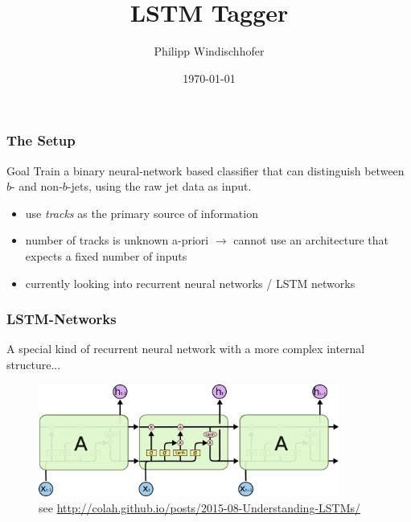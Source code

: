 \documentclass{beamer}
\title{LSTM Tagger}
\author{Philipp Windischhofer}
\date{\today}
\begin{document}
 
\frame{\titlepage}


\begin{frame}
  \frametitle{The Setup}

  \begin{block}{Goal}
    Train a binary neural-network based classifier that can distinguish between $b$- and non-$b$-jets, using the raw jet data as input.
  \end{block}

  \begin{itemize}
  \item use \textsl{tracks} as the primary source of information
  \item number of tracks is unknown a-priori $\rightarrow$ cannot use an architecture that expects a fixed number of inputs
  \item currently looking into recurrent neural networks / LSTM networks
  \end{itemize}
\end{frame}

\begin{frame}
  \frametitle{LSTM-Networks}

  A special kind of recurrent neural network with a more complex internal structure...
  
  \begin{figure}[htb]
    \centering
    \includegraphics[width =0.88\textwidth]{LSTM3-chain.png}
    \caption{see \hyperlink{http://colah.github.io/posts/2015-08-Understanding-LSTMs/}{http://colah.github.io/posts/2015-08-Understanding-LSTMs/}}
  \end{figure}
    
\end{frame}
\end{document}
